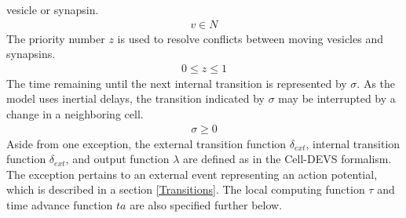 \documentclass{acm_proc_article-sp}
\begin{document}
vesicle or synapsin.
\begin{displaymath} \begin{array}{l}
v \in N
\end{array} \end{displaymath}
The priority number $z$ is used to resolve conflicts between moving
vesicles and synapsins.
\begin{displaymath} \begin{array}{l}
0 \le z \le 1
\end{array} \end{displaymath}
The time remaining until the next internal transition is 
represented by $\sigma$.  As the model uses inertial delays, the 
transition indicated by $\sigma$ may be interrupted by a change 
in a neighboring cell.
\begin{displaymath} \begin{array}{l}
\sigma \ge 0
\end{array} \end{displaymath}
Aside from one exception, the external transition 
function $\delta_{ext}$, internal
transition function $\delta_{ext}$, and output 
function $\lambda$
are defined as in the Cell-DEVS formalism.  The exception pertains to an 
external event representing an action potential, which
is described in a section \ref{Transitions}.  The local computing function
$\tau$ and time advance function $ta$ are also specified further below.
\end{document}
